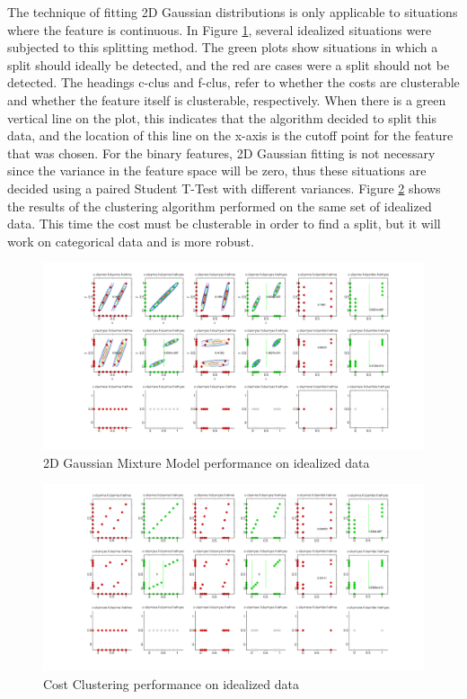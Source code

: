 \documentclass[12pt]{article}
\begin{document}
The technique of fitting 2D Gaussian distributions is only applicable to situations where the feature is continuous. In Figure \ref{fig:2Dgaussians}, several idealized situations were subjected to this splitting method. The green plots show situations in which a split should ideally be detected, and the red are cases were a split should not be detected. The headings c-clus and f-clus, refer to whether the costs are clusterable and whether the feature itself is clusterable, respectively. When there is a green vertical line on the plot, this indicates that the algorithm decided to split this data, and the location of this line on the x-axis is the cutoff point for the feature that was chosen. For the binary features, 2D Gaussian fitting is not necessary since the variance in the feature space will be zero, thus these situations are decided using a paired Student T-Test with different variances. Figure \ref{fig:clustercosts} shows the results of the clustering algorithm performed on the same set of idealized data. This time the cost must be clusterable in order to find a split, but it will work on categorical data and is more robust. 


\begin{figure}[ht]
  \centerline{
  \includegraphics[width=1.5\columnwidth]{2d_gaussians.png}}
  \caption{\label{fig_label} 2D Gaussian Mixture Model performance on idealized data}
  \label{fig:2Dgaussians}
\end{figure}

\begin{figure}[ht]
  \centerline{
  \includegraphics[width=1.5\columnwidth]{cluster_costs.png}}
  \caption{\label{fig_label} Cost Clustering performance on idealized data}
  \label{fig:clustercosts}
\end{figure}
\end{document}
